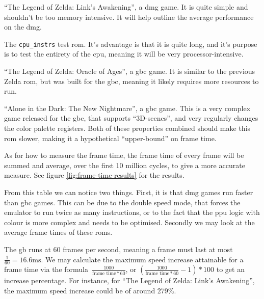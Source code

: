\documentclass[11pt]{report}
\begin{document}
\begin{compactitem}
	\item ``The Legend of Zelda: Link's Awakening'', a \gls{dmg} game. It is quite simple and shouldn't be too memory intensive. It will help outline the average performance on the \gls{dmg}.
	\item The \texttt{cpu\_instrs} test \gls{rom}. It's advantage is that it is quite long, and it's purpose is to test the entirety of the \gls{cpu}, meaning it will be very processor-intensive.
	\item ``The Legend of Zelda: Oracle of Ages'', a \gls{gbc} game. It is similar to the previous Zelda \gls{rom}, but was built for the \gls{gbc}, meaning it likely requires more resources to run.
	\item ``Alone in the Dark: The New Nightmare'', a \gls{gbc} game. This is a very complex game released for the \gls{gbc}, that supports ``3D-scenes'', and very regularly changes the color palette registers\cite[Tricky-to-emulate games]{gbdev_wiki}. Both of these properties combined should make this \gls{rom} slower, making it a hypothetical ``upper-bound'' on frame time.
\end{compactitem}

As for how to measure the frame time, the frame time of every frame will be summed and average, over the first 10 million cycles, to give a more accurate measure. See figure \ref{fig:frame-time-results} for the results.

From this table we can notice two things. First, it is that \gls{dmg} games run faster than \gls{gbc} games. This can be due to the double speed mode, that forces the emulator to run twice as many instructions, or to the fact that the \gls{ppu} logic with colour is more complex and needs to be optimised. Secondly we may look at the average frame times of these \glspl{rom}. 

The \gls{gb} runs at 60 frames per second, meaning a frame must last at most $\frac{1}{60}=16.6\text{ms}$. We may calculate the maximum speed increase attainable for a frame time via the formula~$\frac{1000}{\text{frame time} * 60}$, or $(\frac{1000}{\text{frame time} * 60}-1)*100$ to get an increase percentage. For instance, for ``The Legend of Zelda: Link's Awakening'', the maximum speed increase could be of around 279\%.
\end{document}
